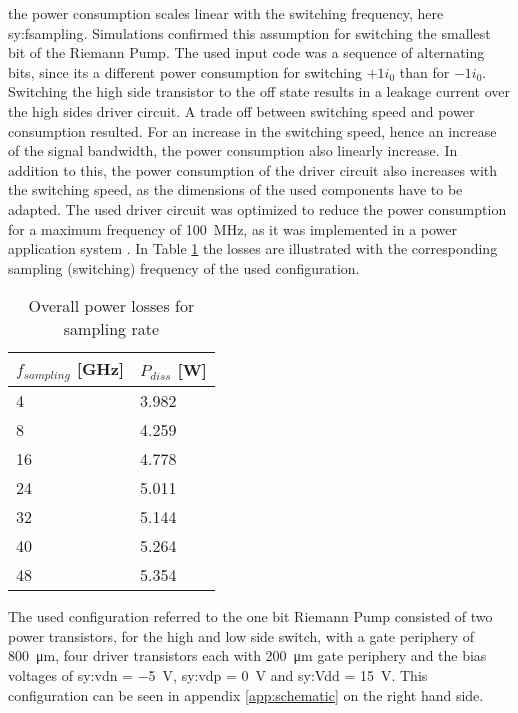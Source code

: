 the power consumption scales linear with the switching frequency, here \gls{sy:fsampling}.
Simulations confirmed this assumption for switching the smallest bit of the Riemann Pump.
The used input code was a sequence of alternating bits, since its a different power consumption for switching $+1 i_0$ than for $-1 i_0$.
Switching the high side transistor to the off state results in a leakage current over the high sides driver circuit.
A trade off between switching speed and power consumption resulted.
For an increase in the switching speed, hence an increase of the signal bandwidth, the power consumption also linearly increase.
In addition to this, the power consumption of the driver circuit also increases with the switching speed, as the dimensions of the used components have to be adapted.
The used driver circuit was optimized to reduce the power consumption for a maximum frequency of \SI{100}{\mega \hertz}, as it was implemented in a power application system \cite{MaksimovicPaper}.
In Table \ref{tab:switchloss} the losses are illustrated with the corresponding sampling (switching) frequency of the used configuration.

\begin{table}[ht]
\centering
\begin{tabular}{|l|l|}
\hline
$f_{sampling}$ {[}GHz{]} & $P_{diss}$ {[}W{]} \\ \hline
4                    & 3.982              \\ \hline
8                    & 4.259              \\ \hline
16                   & 4.778              \\ \hline
24                   & 5.011              \\ \hline
32                   & 5.144              \\ \hline
40                   & 5.264              \\ \hline
48                   & 5.354              \\ \hline
\end{tabular}
\caption{Overall power losses for sampling rate}
\label{tab:switchloss}
\end{table}

The used configuration referred to the one bit Riemann Pump consisted of two power transistors, for the high and low side switch, with a gate periphery of \SI{800}{\micro \meter}, four driver transistors each with \SI{200}{\micro \meter} gate periphery and the bias voltages of \gls{sy:vdn} = \SI{-5}{\volt}, \gls{sy:vdp} = \SI{0}{\volt} and \gls{sy:Vdd} = \SI{15}{\volt}.
This configuration can be seen in appendix \ref{app:schematic} on the right hand side.


